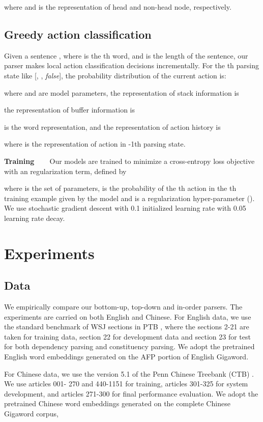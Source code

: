 \documentclass[11pt,letterpaper]{article}
\begin{document}
where  and  is the representation of head and non-head node, respectively. 

\subsection{Greedy action classification}
Given a sentence , where  is the th word, and  is the length of the sentence, our parser makes local action classification decisions incrementally.
For the th parsing state like [, , \textit{false}], the probability distribution of the current action  is:

where  and  are model parameters, the representation of stack information  is

the representation of buffer information  is

 is the word representation, and the representation of action history  is

where  is the representation of action in -1th parsing state.

\textbf{Training} ~~~
Our models are trained to minimize a cross-entropy loss objective with an  regularization term, defined by

where  is the set of parameters,  is the probability of the th action in the th training example given by the model and  is a regularization hyper-parameter ().
We use stochastic gradient descent with 0.1 initialized learning rate with 0.05 learning rate decay.

\section{Experiments}
\subsection{Data}
We empirically compare our bottom-up, top-down and in-order parsers.
The experiments are carried on both English and Chinese.
For English data, we use the standard benchmark of WSJ sections in PTB \cite{Marcus:1993}, where the sections 2-21 are taken for training data, section 22 for development data and section 23 for test for both dependency parsing and constituency parsing.
We adopt the pretrained English word embeddings generated on the AFP portion of English Gigaword.

For Chinese data, we use the version 5.1 of the Penn Chinese Treebank (CTB) \cite{Xue:2005}.
We use articles 001- 270 and 440-1151 for training, articles 301-325 for system development, and articles 271-300 for final performance evaluation.
We adopt the pretrained Chinese word embeddings generated on the complete Chinese Gigaword corpus,
\end{document}
